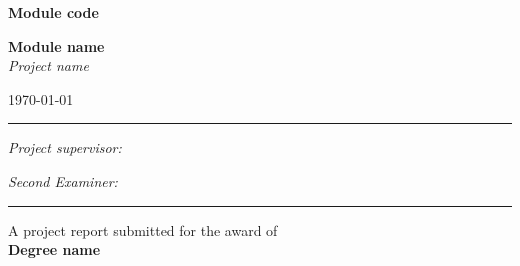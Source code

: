 \thispagestyle{empty}
	
\begin{center}
\vspace{0.2cm}

\huge
\textbf{Module code}
\vspace{0.2cm}

\Large
\textbf{Module name}\\
\textit{Project name}

\vspace{0.2cm}
\today
\par\noindent\rule{\textwidth}{0.4pt}
\vspace{0.1cm}


\vspace{6mm}

\textit{Project supervisor:}\\\vspace{-4mm}
\vspace{6mm}

\textit{Second Examiner:}\\\vspace{-4mm}

\vspace{0.6cm}
\par\noindent\rule{\textwidth}{0.4pt}
\vspace{0.1cm}


A project report submitted for the award of\\
\textbf{Degree name}

\end{center}

\newpage